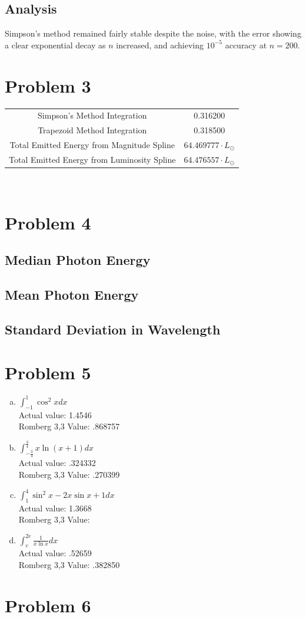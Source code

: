 \documentclass[11pt]{article} %
\begin{document}
\subsection*{Analysis}
Simpson's method remained fairly stable despite the noise, with the error showing a clear exponential decay as $n$ increased,
and achieving $10^{-5}$ accuracy at $n=200$.
\section*{Problem 3}
\begin{tabular}{c c}
Simpson's Method Integration & 0.316200 \\
Trapezoid Method Integration & 0.318500 \\
Total Emitted Energy from Magnitude Spline & $64.469777\cdot L_\odot$\\
Total Emitted Energy from Luminosity Spline & $64.476557\cdot L_\odot$\\
\end{tabular}\\


\section*{Problem 4}

\subsection*{Median Photon Energy}
\subsection*{Mean Photon Energy}
\subsection*{Standard Deviation in Wavelength}


\section*{Problem 5}
\begin{enumerate}[a.)]
\item $\int_{-1}^{1} \cos^2xdx$\\
Actual value: 1.4546 \\
Romberg 3,3 Value: .868757

\item $\int_{-\frac{3}{4}}^{\frac{3}{4}} x \ln(x+1) dx$\\
Actual value: .324332 \\
Romberg 3,3 Value: .270399

\item $\int_{1}^{4} \sin^2x - 2x\sin x +1 dx$\\
Actual value: 1.3668 \\
Romberg 3,3 Value: 

\item $\int_{e}^{2e} \frac{1}{x\ln x}dx$\\
Actual value: .52659\\
Romberg 3,3 Value: .382850
\end{enumerate}

\section*{Problem 6}
\end{document}
